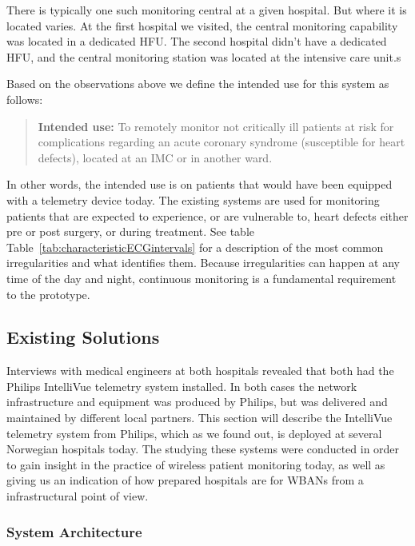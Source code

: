There is typically one such monitoring central at a given hospital. But where it is located varies. At the first hospital we visited, the central monitoring capability was located in a dedicated HFU. The second hospital didn't have a dedicated HFU, and the central monitoring station was located at the intensive care unit.s

Based on the observations above we define the intended use for this system as follows:

\begin{quote}
\textbf{Intended use:} To remotely monitor not critically ill patients at risk for complications regarding an acute coronary syndrome (susceptible for heart defects), located at an IMC or in another ward.
\end{quote}
\noindent
In other words, the intended use is on patients that would have been equipped with a telemetry device today. The existing systems are used for monitoring patients that are expected to experience, or are vulnerable to, heart defects either pre or post surgery, or during treatment. See table Table~\ref{tab:characteristicECGintervals} for a description of the most common irregularities and what identifies them. Because irregularities can happen at any time of the day and night, continuous monitoring is a fundamental requirement to the prototype.


\subsection{Existing Solutions} %
\label{sub:existing_solutions}

Interviews with medical engineers at both hospitals revealed that both had the Philips IntelliVue telemetry system installed. In both cases the network infrastructure and equipment was produced by Philips, but was delivered and maintained by different local partners. This section will describe the IntelliVue telemetry system from Philips, which as we found out, is deployed at several Norwegian hospitals today. The studying these systems were conducted in order to gain insight in the practice of wireless patient monitoring today, as well as giving us an indication of how prepared hospitals are for WBANs from a infrastructural point of view.

\subsubsection{System Architecture} %
\label{ssub:system_architecture}

